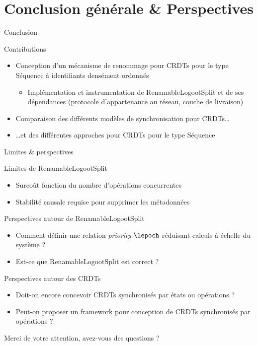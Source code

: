 \section{Conclusion générale \& Perspectives}

\begin{frame}{Conclusion}
  \begin{block}{Contributions}
    \begin{itemize}
      \item Conception d'un mécanisme de renommage pour CRDTs pour le type Séquence à identifiants densément ordonnés
      \begin{itemize}
        \item Implémentation et instrumentation de RenamableLogootSplit et de ses dépendances (protocole d'appartenance au réseau, couche de livraison)
      \end{itemize}
      \pause
      \item Comparaison des différents modèles de synchronisation pour CRDTs\dots
      \item \dots et des différentes approches pour CRDTs pour le type Séquence
    \end{itemize}
  \end{block}
\end{frame}

\begin{frame}{Limites \& perspectives}
  \begin{block}{Limites de RenamableLogootSplit}
    \begin{itemize}
      \item Surcoût fonction du nombre d'opérations \ren concurrentes
      \item Stabilité causale requise pour supprimer les métadonnées
    \end{itemize}
  \end{block}
  \begin{block}{Perspectives autour de RenamableLogootSplit}
    \begin{itemize}
      \item Comment définir une relation \emph{priority} $\lepoch$ réduisant calculs à échelle du système ?
      \item Est-ce que RenamableLogootSplit est correct ?
    \end{itemize}
  \end{block}
  \pause
  \begin{block}{Perspectives autour des CRDTs}
    \begin{itemize}
      \item Doit-on encore concevoir CRDTs synchronisés par états ou opérations ?
      \item Peut-on proposer un framework pour conception de CRDTs synchronisés par opérations ?
    \end{itemize}
  \end{block}
\end{frame}

\begin{frame}[standout]
  Merci de votre attention, avez-vous des questions ?
  \vspace{3em}
  \begin{center}
    \ccby
  \end{center}
\end{frame}
